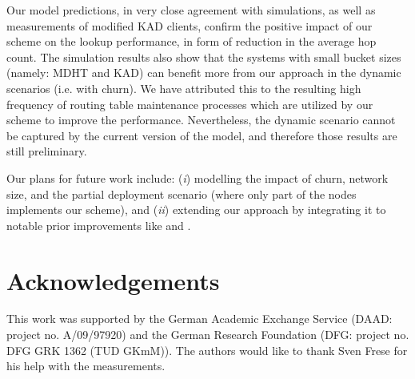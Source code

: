 \documentclass[10pt, conference, compsocconf, letterpaper]{IEEEtran}
\begin{document}
Our model predictions, in very close agreement with simulations, as well as measurements of modified KAD clients, confirm the positive impact of our scheme on the lookup performance, in form of reduction in the average hop count. The simulation results also show that the systems with small bucket sizes (namely: MDHT and KAD) can benefit more from our approach in the dynamic scenarios (i.e. with churn). We have attributed this to the resulting high frequency of routing table maintenance processes which are utilized by our scheme to improve the performance. Nevertheless, the dynamic scenario cannot be captured by the current version of the model, and therefore those results are still preliminary.

Our plans for future work include: (\emph{i}) modelling the impact of churn, network size, and the partial deployment scenario (where only part of the nodes implements our scheme), and (\emph{ii})  extending our approach by integrating it to notable prior improvements like \cite{kaune08embracing} and \cite{li2005bandwidth}.



\section*{Acknowledgements}
This work was supported by the German Academic Exchange Service (DAAD: project no. A/09/97920) and the German Research Foundation (DFG: project no. DFG GRK 1362 (TUD GKmM)). The authors would like to thank Sven Frese for his help with the measurements.





\end{document}
